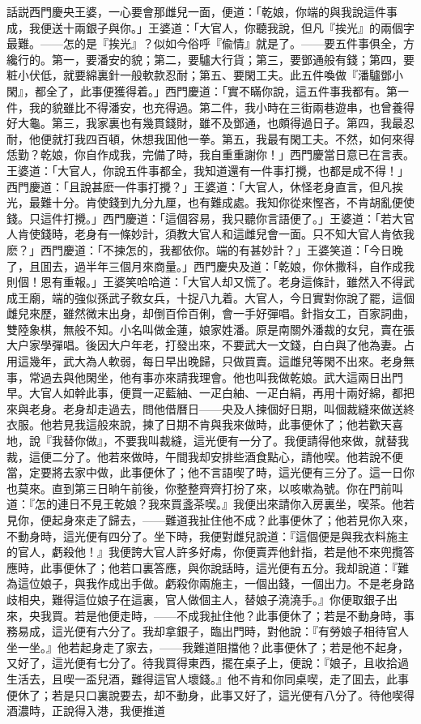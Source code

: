 話説西門慶央王婆，一心要會那雌兒一面，便道：「乾娘，你端的與我說這件事成，我便送十兩銀子與你。」王婆道：「大官人，你聽我說，但凡『挨光』的兩個字最難。——怎的是『挨光』？似如今俗呼『偸情』就是了。——要五件事俱全，方纔行的。第一，要潘安的貌；第二，要驢大行貨；第三，要鄧通般有錢；第四，要粧小伏低，就要綿裏針一般軟款忍耐；第五、要閑工夫。此五件喚做『潘驢鄧小閑』，都全了，此事便獲得着。」西門慶道：「實不瞞你說，這五件事我都有。第一件，我的貌雖比不得潘安，也充得過。第二件，我小時在三街兩巷遊串，也曾養得好大龜。第三，我家裏也有幾貫錢財，雖不及鄧通，也頗得過日子。第四，我最忍耐，他便就打我四百頓，休想我囬他一拳。第五，我最有閑工夫。不然，如何來得恁勤？乾娘，你自作成我，完備了時，我自重重謝你！」西門慶當日意已在言表。王婆道：「大官人，你說五件事都全，我知道還有一件事打攪，也都是成不得！」西門慶道：「且說甚麽一件事打攪？」王婆道：「大官人，休怪老身直言，但凡挨光，最難十分。肯使錢到九分九厘，也有難成處。我知你從來慳吝，不肯胡亂便使錢。只這件打攪。」西門慶道：「這個容易，我只聽你言語便了。」王婆道：「若大官人肯使錢時，老身有一條妙計，須教大官人和這雌兒會一面。只不知大官人肯依我麽？」西門慶道：「不揀怎的，我都依你。端的有甚妙計？」王婆笑道：「今日晚了，且囬去，過半年三個月來商量。」西門慶央及道：「乾娘，你休撒科，自作成我則個！恩有重報。」王婆笑哈哈道：「大官人却又慌了。老身這條計，雖然入不得武成王廟，端的強似孫武子敎女兵，十捉八九着。大官人，今日實對你說了罷，這個雌兒來歷，雖然微末出身，却倒百伶百俐，會一手好彈唱。針指女工，百家詞曲，雙陸象棋，無般不知。小名叫做金蓮，娘家姓潘。原是南關外潘裁的女兒，賣在張大户家學彈唱。後因大户年老，打發出來，不要武大一文錢，白白與了他為妻。占用這幾年，武大為人軟弱，每日早出晚歸，只做買賣。這雌兒等閑不出來。老身無事，常過去與他閑坐，他有事亦來請我理會。他也叫我做乾娘。武大這兩日出門早。大官人如幹此事，便買一疋藍紬、一疋白紬、一疋白絹，再用十兩好綿，都把來與老身。老身却走過去，問他借曆日——央及人揀個好日期，叫個裁縫來做送終衣服。他若見我這般來說，揀了日期不肯與我來做時，此事便休了；他若歡天喜地，說『我替你做』，不要我叫裁縫，這光便有一分了。我便請得他來做，就替我裁，這便二分了。他若來做時，午間我却安排些酒食點心，請他喫。他若說不便當，定要將去家中做，此事便休了；他不言語喫了時，這光便有三分了。這一日你也莫來。直到第三日晌午前後，你整整齊齊打扮了來，以咳嗽為號。你在門前叫道：『怎的連日不見王乾娘？我來買盞茶喫。』我便出來請你入房裏坐，喫茶。他若見你，便起身來走了歸去，——難道我扯住他不成？此事便休了；他若見你入來，不動身時，這光便有四分了。坐下時，我便對雌兒說道：『這個便是與我衣料施主的官人，虧殺他！』我便誇大官人許多好䖏，你便賣弄他針指，若是他不來兜攬答應時，此事便休了；他若口裏答應，與你說話時，這光便有五分。我却說道：『難為這位娘子，與我作成出手做。虧殺你兩施主，一個出錢，一個出力。不是老身路歧相央，難得這位娘子在這裏，官人做個主人，替娘子澆澆手。』你便取銀子出來，央我買。若是他便走時，——不成我扯住他？此事便休了；若是不動身時，事務易成，這光便有六分了。我却拿銀子，臨出門時，對他說：『有勞娘子相待官人坐一坐。』他若起身走了家去，——我難道阻擋他？此事便休了；若是他不起身，又好了，這光便有七分了。待我買得東西，擺在桌子上，便說：『娘子，且收拾過生活去，且喫一盃兒酒，難得這官人壞錢。』他不肯和你同桌喫，走了囬去，此事便休了；若是只口裏說要去，却不動身，此事又好了，這光便有八分了。待他喫得酒濃時，正說得入港，我便推道